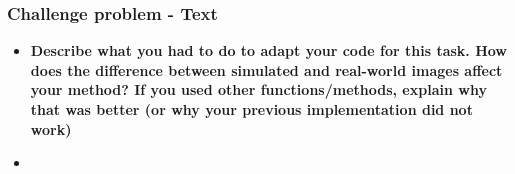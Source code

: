 \documentclass[../report.tex]{subfiles}
\begin{document}
	\begin{frame}[t]
		\frametitle{Challenge problem - Text}
		
		\begin{normalsize}
			\begin{itemize}
				\setlength\itemsep{1em}\fontsize{6pt}{6pt}
				
				\item[] \textbf{Describe what you had to do to adapt your code for this task. How does the difference between simulated and real-world images affect your method? If you used other functions/methods, explain why that was better (or why your previous implementation did not work)}

				\item[] {\selectfont\textcolor{blue}{}}

			\end{itemize}
		\end{normalsize}
		
	\end{frame}
\end{document}
